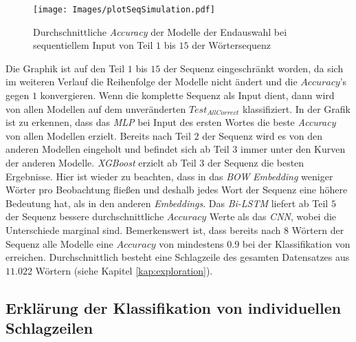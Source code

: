 \documentclass[a4paper,11pt]{article}
\begin{document}
\begin{figure}[ht]
    \centering
\texttt{[image: Images/plotSeqSimulation.pdf]} 
\caption{Durchschnittliche \textit{Accuracy} der Modelle der Endauswahl bei sequentiellem Input von Teil $1$ bis $15$ der Wörtersequenz}
\label{abb:plotSeqSimulation}
\end{figure}


Die Graphik ist auf den Teil $1$ bis $15$ der Sequenz eingeschränkt worden, da sich im weiteren Verlauf die Reihenfolge der Modelle nicht ändert und die $Accuracy$'s gegen $1$ konvergieren. Wenn die komplette Sequenz als Input dient, dann wird von allen Modellen auf dem unveränderten $Test_{AllCorrect}$ klassifiziert. In der Grafik ist zu erkennen, dass das \textit{MLP} bei Input des ersten Wortes die beste \textit{Accuracy} von allen Modellen erzielt. Bereits nach Teil $2$ der Sequenz wird es von den anderen Modellen eingeholt und befindet sich ab Teil $3$ immer unter den Kurven der anderen Modelle. \textit{XGBoost} erzielt ab Teil $3$ der Sequenz die besten Ergebnisse. Hier ist wieder zu beachten, dass in das \textit{BOW} \textit{Embedding} weniger Wörter pro Beobachtung fließen und deshalb jedes Wort der Sequenz eine höhere Bedeutung hat, als in den anderen \textit{Embeddings}. Das \textit{Bi-LSTM} liefert ab Teil $5$ der Sequenz bessere durchschnittliche $Accuracy$ Werte als das \textit{CNN}, wobei die Unterschiede marginal sind. Bemerkenswert ist, dass bereits nach $8$ Wörtern der Sequenz alle Modelle eine $Accuracy$ von mindestens $0.9$ bei der Klassifikation von erreichen. Durchschnittlich besteht eine Schlagzeile des gesamten Datensatzes aus $11.022$ Wörtern (siehe Kapitel \ref{kap:exploration}).


\subsection{Erklärung der Klassifikation von individuellen Schlagzeilen}
\end{document}
